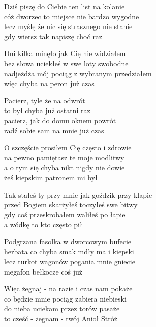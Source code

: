 \begin{text}
    Dziś piszę do Ciebie ten list na kolanie\\
    cóż dworzec to miejsce nie bardzo wygodne\\
    lecz myślę że nic się strasznego nie stanie\\
    gdy wiersz tak napiszę choć raz

    Dni kilka minęło jak Cię nie widziałem\\
    bez słowa uciekłeś w swe loty swobodne\\
    nadjeżdża mój pociąg z wybranym przedziałem\\
    więc chyba na peron już czas

    \vin Pacierz, tyle że na odwrót\\
    \vin to był chyba już ostatni raz\\
    \vin pacierz, jak do domu oknem powrót\\
    \vin radź sobie sam na mnie już czas

    O szczęście prosiłem Cię często i zdrowie\\
    na pewno pamiętasz te moje modlitwy\\
    a o tym się chyba nikt nigdy nie dowie\\
    żeś kiepskim patronem mi był

    Tak stałeś ty przy mnie jak goździk przy klapie\\
    przed Bogiem skarżyłeś toczyłeś swe bitwy\\
    gdy coś przeskrobałem waliłeś po łapie\\
    a wódkę to kto często pił

    Podgrzana fasolka w dworcowym bufecie\\
    herbata co chyba smak mdły ma i kiepski\\
    lecz turkot wagonów pogania mnie gniecie\\
    megafon bełkocze coś już

    Więc żegnaj - na razie i czas nam pokaże\\
    co będzie mnie pociąg zabiera niebieski\\
    do nieba uciekam przez torów pasaże\\
    to cześć - żegnam - twój Anioł Stróż
\end{text}
\begin{chord}

\end{chord}